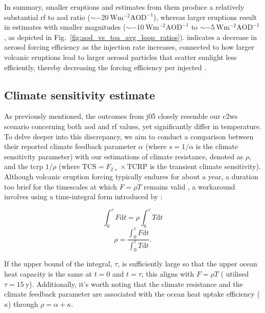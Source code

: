 \documentclass{ametsocV6.1}
\newcommand{\iso}[1][i]{{#1}njected \ce{SO2}}
\begin{document}
In summary, smaller eruptions and estimates from them produce a relatively substantial
\gls{rf} to \gls{aod} ratio (\(\sim \SI{-20}{\watt\metre^{-2}\mathrm{AOD}^{-1}}\)),
whereas larger eruptions result in estimates with smaller magnitudes (\(\sim
\SI{-10}{\watt\metre^{-2}\mathrm{AOD}^{-1}}\) to \(\sim
\SI{-5}{\watt\metre^{-2}\mathrm{AOD}^{-1}}\), as depicted in
Fig.~\ref{fig:aod_vs_toa_avg_loop_ratios}). \citet{niemeier2017} indicates a decrease in
aerosol forcing efficiency as the injection rate increases, connected to how larger
volcanic eruptions lead to larger aerosol particles that scatter sunlight less
efficiently, thereby decreasing the forcing efficiency per \iso{} \citep{english2013,
  timmreck2018}.

\subsection{Climate sensitivity estimate}

As previously mentioned, the outcomes from \gls{j05} closely resemble our \gls{c2ws}
scenario concerning both \gls{aod} and \gls{rf} values, yet significantly differ in
temperature. To delve deeper into this discrepancy, we aim to conduct a comparison
between their reported climate feedback parameter \(\alpha \) (where \(s=1/\alpha \) is
the climate sensitivity parameter) with our estimations of climate resistance, denoted
as \(\rho \), and the \gls{tcrp} \(1/\rho\) (where \(\mathrm{TCS}=F_{2\times}\times
\mathrm{TCRP}\) is the transient climate sensitivity). Although volcanic eruption
forcing typically endures for about a year, a duration too brief for the timescales at
which \(F=\rho T\) remains valid \citep{gregory2016}, a workaround involves using a
time-integral form introduced by \citet{merlis2014}:

\begin{equation}
  \int_0^{\tau}F \mathrm{d}t=\rho\int_{0}^{\tau}T \mathrm{d}t
\end{equation}
\begin{equation}
  \rho=\frac{\int_0^{\tau}F \mathrm{d}t}{\int_{0}^{\tau}T \mathrm{d}t}.
  \label{eq:climate-resistance}
\end{equation}

If the upper bound of the integral, \(\tau \), is sufficiently large so that the upper
ocean heat capacity is the same at \(t=0\) and \(t=\tau \), this aligns with \(F=\rho
T\) \citep{gregory2016} (\citet{merlis2014} utilised \(\tau =\SI{15}{\mathrm{y}}\)).
Additionally, it's worth noting that the climate resistance and the climate feedback
parameter are associated with the ocean heat uptake efficiency (\(\kappa \)) through
\(\rho =\alpha +\kappa \).
\end{document}
